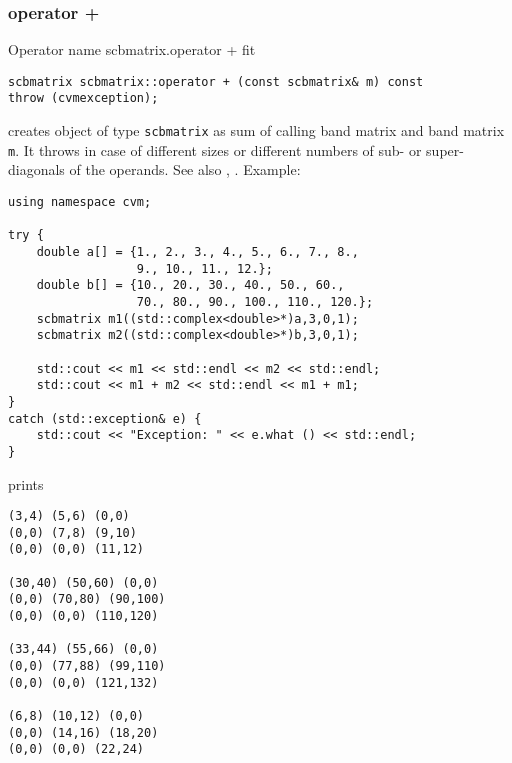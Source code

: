 \subsubsection{operator +}
Operator%
\pdfdest name {scbmatrix.operator +} fit
\begin{verbatim}
scbmatrix scbmatrix::operator + (const scbmatrix& m) const
throw (cvmexception);
\end{verbatim}
creates  object of type \verb"scbmatrix" as  sum of
 calling band matrix and  band matrix \verb"m".
It throws  
in case of different sizes or different numbers of sub- or super-diagonals
of the operands.
See also , .
Example:
\begin{Verbatim}
using namespace cvm;

try {
    double a[] = {1., 2., 3., 4., 5., 6., 7., 8.,
                  9., 10., 11., 12.};
    double b[] = {10., 20., 30., 40., 50., 60., 
                  70., 80., 90., 100., 110., 120.};
    scbmatrix m1((std::complex<double>*)a,3,0,1);
    scbmatrix m2((std::complex<double>*)b,3,0,1);

    std::cout << m1 << std::endl << m2 << std::endl;
    std::cout << m1 + m2 << std::endl << m1 + m1;
}
catch (std::exception& e) {
    std::cout << "Exception: " << e.what () << std::endl;
}
\end{Verbatim}
prints
\begin{Verbatim}
(3,4) (5,6) (0,0)
(0,0) (7,8) (9,10)
(0,0) (0,0) (11,12)

(30,40) (50,60) (0,0)
(0,0) (70,80) (90,100)
(0,0) (0,0) (110,120)

(33,44) (55,66) (0,0)
(0,0) (77,88) (99,110)
(0,0) (0,0) (121,132)

(6,8) (10,12) (0,0)
(0,0) (14,16) (18,20)
(0,0) (0,0) (22,24)
\end{Verbatim}
\newpage



